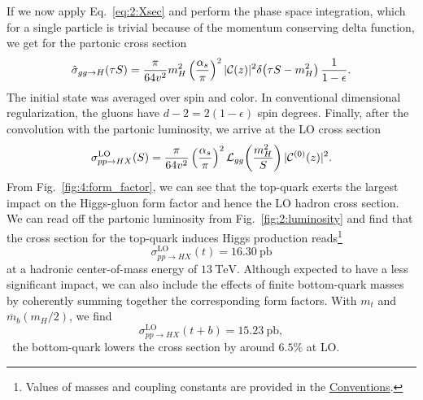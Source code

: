 If we now apply Eq.~\eqref{eq:2:Xsec} and perform the phase space integration, which for a single particle is trivial because of the momentum conserving delta function, we get for the partonic cross section
\begin{equation}
\hat{\sigma}_{gg \rightarrow H}(\tau S) = \frac{\pi}{64 v^2} m_H^2 \left( \frac{\alpha_s}{\pi} \right)^2 |\mathcal{C}(z)|^2 \delta\! \left(\tau S - m_H^2 \right) \frac{1}{1 - \epsilon}.
\label{eq:4:ggH_cross_section}
\end{equation}
The initial state was averaged over spin and color. In conventional dimensional regularization, the gluons have $d - 2 = 2 (1 - \epsilon)$ spin degrees. Finally, after the convolution with the partonic luminosity, we arrive at the LO cross section
\begin{equation}
\sigma_{pp \rightarrow HX}^{\text{LO}}(S) = \frac{\pi}{64v^2} \left(\frac{\alpha_s}{\pi} \right)^2 \mathcal{L}_{gg}\!\left(\frac{m_H^2}{S} \right) |\mathcal{C}^{(0)}(z)|^2.
\end{equation}
From Fig.~\ref{fig:4:form_factor}, we can see that the top-quark exerts the largest impact on the Higgs-gluon form factor and hence the \acs{LO} hadron cross section. We can read off the partonic luminosity from Fig.~\ref{fig:2:luminosity} and find that the cross section for the top-quark induces Higgs production reads\footnote{Values of masses and coupling constants are provided in the \hyperref[chap:notation_and_conventions]{Conventions}.}
\begin{equation}
\sigma_{pp \rightarrow HX}^{\text{LO}} (t) = 16.30\ \mathrm{pb}
\end{equation}
at a hadronic center-of-mass energy of $13\ \text{TeV}$. Although expected to have a less significant impact, we can also include the effects of finite bottom-quark masses by coherently summing together the corresponding form factors. With $m_t$ and $\overline{m}_b(m_H/2)$, we find
\begin{equation}
\sigma_{pp \rightarrow HX}^{\text{LO}}(t+b) = 15.23\ \mathrm{pb},
\end{equation}
\ie\ the bottom-quark lowers the cross section by around $6.5\%$ at \acs{LO}.

